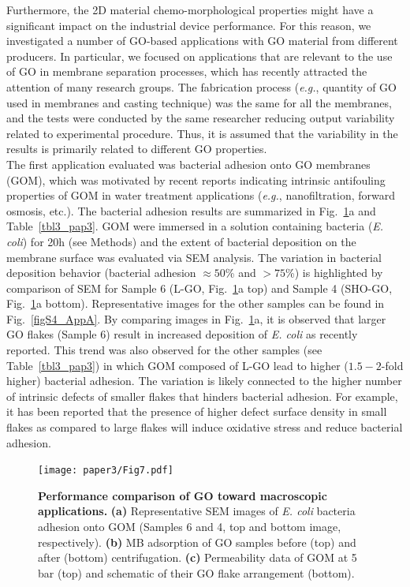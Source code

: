 Furthermore, the 2D material chemo-morphological properties might have a significant impact on the industrial device performance. For this reason, we investigated a number of GO-based applications with GO material from different producers. In particular, we focused on applications that are relevant to the use of GO in membrane separation processes, which has recently attracted the attention of many research groups.\cite{mi2014graphene,willcox2017molecular,huang2015graphene} The fabrication process (\textit{e.g.}, quantity of GO used in membranes and casting technique) was the same for all the membranes, and the tests were conducted by the same researcher reducing output variability related to experimental procedure. Thus, it is assumed that the variability in the results is primarily related to different GO properties.\\
The first application evaluated was bacterial adhesion onto GO membranes (GOM), which was motivated by recent reports indicating intrinsic antifouling properties of GOM in water treatment applications (\textit{e.g.}, nanofiltration, forward osmosis, etc.).\cite{hegab2015fine,hu2014layer} The bacterial adhesion results are summarized in Fig.~\ref{Fig7_pap3}a and Table~\ref{tbl3_pap3}. GOM were immersed in a solution containing bacteria (\textit{E. coli}) for 20h (see Methods) and the extent of bacterial deposition on the membrane surface was evaluated via SEM analysis. The variation in bacterial deposition behavior (bacterial adhesion $\approx50$\% and $>75$\%) is highlighted by comparison of SEM for Sample 6 (L-GO,  Fig.~\ref{Fig7_pap3}a top) and Sample 4 (SHO-GO, Fig.~\ref{Fig7_pap3}a bottom). Representative images for the other samples can be found in Fig.~\ref{figS4_AppA}. By comparing images in Fig.~\ref{Fig7_pap3}a, it is observed that larger GO flakes (Sample 6) result in increased deposition of \textit{E. coli} as recently reported.\cite{perreault2015antimicrobial} This trend was also observed for the other samples (see Table~\ref{tbl3_pap3}) in which GOM composed of L-GO lead to higher ($1.5-2$-fold higher) bacterial adhesion. The variation is likely connected to the higher number of intrinsic defects of smaller flakes that hinders bacterial adhesion. For example, it has been reported that the presence of higher defect surface density in small flakes as compared to large flakes will induce oxidative stress and reduce bacterial adhesion.\cite{perreault2015antimicrobial}

\begin{figure}
  \centering
  \texttt{[image: paper3/Fig7.pdf]}
  \caption{\textbf{Performance comparison of GO toward macroscopic applications.} \textbf{(a)} Representative SEM images of \textit{E. coli} bacteria adhesion onto GOM (Samples 6 and 4, top and bottom image, respectively).  \textbf{(b)} MB adsorption of GO samples before (top) and after (bottom) centrifugation.  \textbf{(c)} Permeability data of GOM at 5 bar (top) and schematic of their GO flake arrangement (bottom).}
  \label{Fig7_pap3}
\end{figure}

